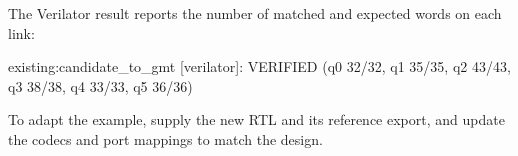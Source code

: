 The Verilator result reports the number of matched and expected words on each link:

\begin{codeblock}[basicstyle=\ttfamily\scriptsize]
existing:candidate_to_gmt [verilator]: VERIFIED (q0 32/32, q1 35/35, q2 43/43, q3 38/38, q4 33/33, q5 36/36)
\end{codeblock}

To adapt the example, supply the new RTL and its reference export, and update the codecs and port mappings to match the design.
